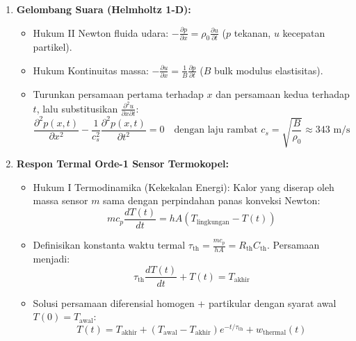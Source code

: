 \documentclass[11pt,a4paper]{article}
\begin{document}
\begin{penurunanbox}
\begin{enumerate}[leftmargin=*]
  \item \textbf{Gelombang Suara (Helmholtz 1-D):}
  \begin{itemize}
    \item Hukum II Newton fluida udara: $-\frac{\partial p}{\partial x} = \rho_0 \frac{\partial u}{\partial t}$ ($p$ tekanan, $u$ kecepatan partikel).
    \item Hukum Kontinuitas massa: $-\frac{\partial u}{\partial x} = \frac{1}{B}\frac{\partial p}{\partial t}$ ($B$ bulk modulus elastisitas).
    \item Turunkan persamaan pertama terhadap $x$ dan persamaan kedua terhadap $t$, lalu substitusikan $\frac{\partial^2 u}{\partial x \partial t}$:
    \begin{equation}
    \frac{\partial^2 p(x,t)}{\partial x^2} - \frac{1}{c_s^2}\frac{\partial^2 p(x,t)}{\partial t^2} = 0 \quad \text{dengan laju rambat } c_s = \sqrt{\frac{B}{\rho_0}} \approx 343\text{ m/s}
    \end{equation}
  \end{itemize}

  \item \textbf{Respon Termal Orde-1 Sensor Termokopel:}
  \begin{itemize}
    \item Hukum I Termodinamika (Kekekalan Energi): Kalor yang diserap oleh massa sensor $m$ sama dengan perpindahan panas konveksi Newton:
    \[
    m c_p \frac{dT(t)}{dt} = h A \left( T_{\text{lingkungan}} - T(t) \right)
    \]
    \item Definisikan konstanta waktu termal $\tau_{\text{th}} = \frac{m c_p}{h A} = R_{\text{th}} C_{\text{th}}$. Persamaan menjadi:
    \[
    \tau_{\text{th}}\frac{dT(t)}{dt} + T(t) = T_{\text{akhir}}
    \]
    \item Solusi persamaan diferensial homogen + partikular dengan syarat awal $T(0) = T_{\text{awal}}$:
    \begin{equation}
    T(t) = T_{\text{akhir}} + (T_{\text{awal}} - T_{\text{akhir}})e^{-t/\tau_{\text{th}}} + w_{\text{thermal}}(t)
    \end{equation}
  \end{itemize}


\end{enumerate}
\end{penurunanbox}
\end{document}
